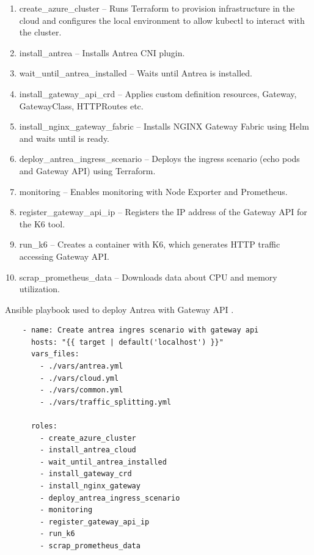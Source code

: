 \begin{enumerate}
  \item create\_azure\_cluster -- Runs Terraform to provision infrastructure in the cloud and configures the local environment to allow kubectl to interact with the cluster.
  \item install\_antrea -- Installs Antrea CNI plugin.
  \item wait\_until\_antrea\_installed -- Waits until Antrea is installed.
  \item install\_gateway\_api\_crd -- Applies custom definition resources, Gateway, GatewayClass, HTTPRoutes etc.
  \item install\_nginx\_gateway\_fabric -- Installs NGINX Gateway Fabric using Helm and waits until is ready.
  \item deploy\_antrea\_ingress\_scenario -- Deploys the ingress scenario (echo pods and Gateway API) using Terraform.
  \item monitoring -- Enables monitoring with Node Exporter and Prometheus.
  \item register\_gateway\_api\_ip -- Registers the IP address of the Gateway API for the K6 tool.
  \item run\_k6 -- Creates a container with K6, which generates HTTP traffic accessing Gateway API.
  \item scrap\_prometheus\_data -- Downloads data about CPU and memory utilization.
\end{enumerate}

\begin{listing}[H]
  \centering
  \caption{Ansible playbook used to deploy Antrea with Gateway API \cite{AnsibleDocs}.}
  \begin{verbatim}
    - name: Create antrea ingres scenario with gateway api
      hosts: "{{ target | default('localhost') }}"
      vars_files:
        - ./vars/antrea.yml
        - ./vars/cloud.yml
        - ./vars/common.yml
        - ./vars/traffic_splitting.yml

      roles:
        - create_azure_cluster
        - install_antrea_cloud
        - wait_until_antrea_installed
        - install_gateway_crd
        - install_nginx_gateway
        - deploy_antrea_ingress_scenario
        - monitoring
        - register_gateway_api_ip
        - run_k6
        - scrap_prometheus_data
  \end{verbatim}
  \label{lst:antreaIngressPlaybook}
\end{listing}


